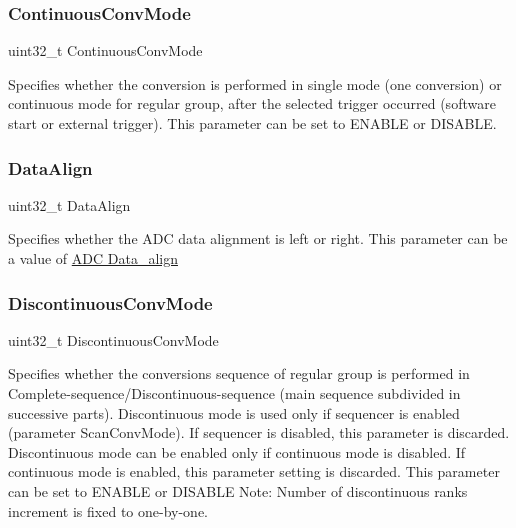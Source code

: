 \subsubsection{\texorpdfstring{Continuous\+Conv\+Mode}{ContinuousConvMode}}
{\footnotesize\ttfamily uint32\+\_\+t Continuous\+Conv\+Mode}

Specifies whether the conversion is performed in single mode (one conversion) or continuous mode for regular group, after the selected trigger occurred (software start or external trigger). This parameter can be set to E\+N\+A\+B\+LE or D\+I\+S\+A\+B\+LE. \mbox{\label{struct_a_d_c___init_type_def_afe646b2571044212378bf5f722544359}} 
\subsubsection{\texorpdfstring{Data\+Align}{DataAlign}}
{\footnotesize\ttfamily uint32\+\_\+t Data\+Align}

Specifies whether the A\+DC data alignment is left or right. This parameter can be a value of \hyperlink{group___a_d_c___data__align}{A\+DC Data\+\_\+align} \mbox{\label{struct_a_d_c___init_type_def_a9029916649c9ed5db0a3d86c7a0841bb}} 
\subsubsection{\texorpdfstring{Discontinuous\+Conv\+Mode}{DiscontinuousConvMode}}
{\footnotesize\ttfamily uint32\+\_\+t Discontinuous\+Conv\+Mode}

Specifies whether the conversions sequence of regular group is performed in Complete-\/sequence/\+Discontinuous-\/sequence (main sequence subdivided in successive parts). Discontinuous mode is used only if sequencer is enabled (parameter \textquotesingle{}Scan\+Conv\+Mode\textquotesingle{}). If sequencer is disabled, this parameter is discarded. Discontinuous mode can be enabled only if continuous mode is disabled. If continuous mode is enabled, this parameter setting is discarded. This parameter can be set to E\+N\+A\+B\+LE or D\+I\+S\+A\+B\+LE Note\+: Number of discontinuous ranks increment is fixed to one-\/by-\/one. \mbox{\label{struct_a_d_c___init_type_def_a304c6a7957f73ed08df4f8a5d467958f}} 
